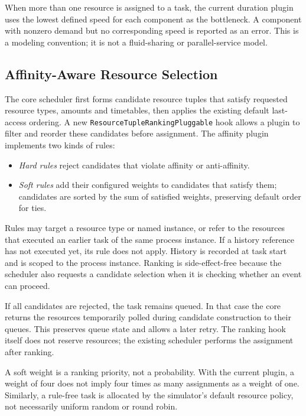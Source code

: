 \documentclass[conference]{IEEEtran}
\begin{document}
When more than one resource is assigned to a task, the current duration plugin uses the lowest defined speed for each
component as the bottleneck. A component with nonzero demand but no corresponding speed is reported as an error. This
is a modeling convention; it is not a fluid-sharing or parallel-service model.

\subsection{Affinity-Aware Resource Selection}

The core scheduler first forms candidate resource tuples that satisfy requested resource types, amounts and timetables,
then applies the existing default last-access ordering. A new \texttt{ResourceTupleRankingPluggable} hook allows a
plugin to filter and reorder these candidates before assignment. The affinity plugin implements two kinds of rules:

\begin{itemize}
  \item \emph{Hard rules} reject candidates that violate affinity or anti-affinity.
  \item \emph{Soft rules} add their configured weights to candidates that satisfy them; candidates are sorted by the
        sum of satisfied weights, preserving default order for ties.
\end{itemize}

Rules may target a resource type or named instance, or refer to the resources that executed an earlier task of the
same process instance. If a history reference has not executed yet, its rule does not apply. History is recorded at
task start and is scoped to the process instance. Ranking is side-effect-free because the scheduler also requests a
candidate selection when it is checking whether an event can proceed.

If all candidates are rejected, the task remains queued. In that case the core returns the resources temporarily
polled during candidate construction to their queues. This preserves queue state and allows a later retry. The ranking
hook itself does not reserve resources; the existing scheduler performs the assignment after ranking.

A soft weight is a ranking priority, not a probability. With the current plugin, a weight of four does not imply four
times as many assignments as a weight of one. Similarly, a rule-free task is allocated by the simulator's default
resource policy, not necessarily uniform random or round robin.
\end{document}
